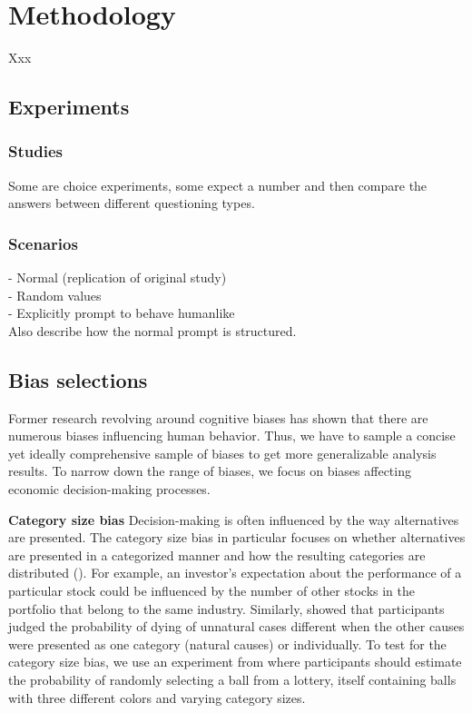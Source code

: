\section{Methodology}
Xxx

\subsection{Experiments}
\subsubsection{Studies}
Some are choice experiments, some expect a number and then compare the answers between different questioning types.

\subsubsection{Scenarios}
- Normal (replication of original study) \\
- Random values \\
- Explicitly prompt to behave humanlike \\

Also describe how the normal prompt is structured.


\subsection{Bias selections}
\par Former research revolving around cognitive biases has shown that there are numerous biases influencing human behavior. Thus, we have to sample a concise yet ideally comprehensive sample of biases to get more generalizable analysis results. To narrow down the range of biases, we focus on biases affecting economic decision-making processes.

\setlength{\parindent}{20pt}
\par \textbf{Category size bias} Decision-making is often influenced by the way alternatives are presented. The category size bias in particular focuses on whether alternatives are presented in a categorized manner and how the resulting categories are distributed (\cite{isaac2014judging}). For example, an investor's expectation about the performance of a particular stock could be influenced by the number of other stocks in the portfolio that belong to the same industry. Similarly, \cite{tversky1994support} showed that participants judged the probability of dying of unnatural cases different when the other causes were presented as one category (natural causes) or individually. To test for the category size bias, we use an experiment from \cite{isaac2014judging} where participants should estimate the probability of randomly selecting a ball from a lottery, itself containing balls with three different colors and varying category sizes.

